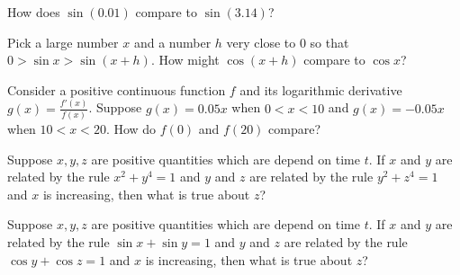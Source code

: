 \documentclass{ximera}
\newcommand{\recommendation}[1]{}
\begin{document}
\begin{problem}
  How does $\sin(0.01)$ compare to $\sin(3.14)$?
  \begin{multipleChoice}
  \end{multipleChoice}
\end{problem}

\begin{problem}
  Pick a large number $x$ and a number $h$ very close to $0$ so that $0 > \sin x > \sin (x+h)$.  How might $\cos (x+h)$ compare to $\cos x$?
  \begin{multipleChoice}
  \end{multipleChoice}
\end{problem}

\begin{problem}
  Consider a positive continuous function $f$ and its logarithmic
  derivative $g(x) = \frac{f'(x)}{f(x)}$.  Suppose $g(x) = 0.05x$ when
  $0 < x < 10$ and $g(x) = -0.05x$ when $10 < x < 20$.  How do $f(0)$
  and $f(20)$ compare?
  \begin{multipleChoice}
  \end{multipleChoice}
\end{problem}

\begin{problem}
  Suppose $x, y, z$ are positive quantities which are depend on time
  $t$.  If $x$ and $y$ are related by the rule $x^2 + y^4 = 1$ and $y$
  and $z$ are related by the rule $y^2 + z^4 = 1$ and $x$ is
  increasing, then what is true about $z$?
  \begin{multipleChoice}
  \end{multipleChoice}
\end{problem}

\begin{problem}
  Suppose $x, y, z$ are positive quantities which are depend on time
  $t$.  If $x$ and $y$ are related by the rule $\sin x + \sin y = 1$ and $y$
  and $z$ are related by the rule $\cos y + \cos z = 1$ and $x$ is
  increasing, then what is true about $z$?
  \begin{multipleChoice}
  \end{multipleChoice}
\end{problem}
\end{document}
